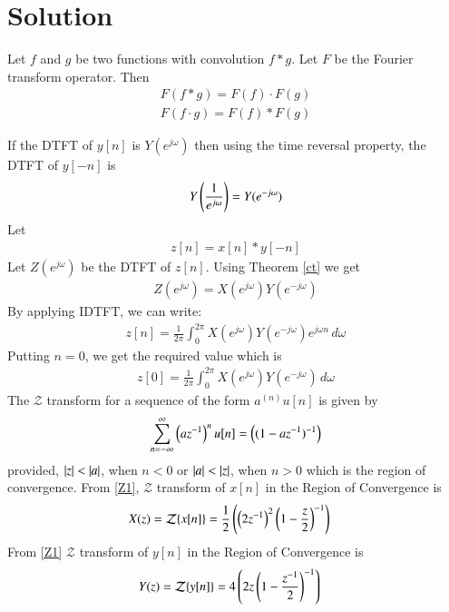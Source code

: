 \documentclass[journal,12pt,twocolumn]{IEEEtran}
\begin{document}
\section{Solution}
\begin{theorem} \label{ct}
Let $f$ and $g$ be two functions with convolution $f*g$. Let $F$ be the Fourier transform operator. Then
\begin{align}
F(f * g)=F(f) \cdot F(g)\\
F(f \cdot g)=F(f) * F(g)
\end{align}
\end{theorem}
If the DTFT of $y[n]$ is $Y(e^{j\omega})$  then using the time reversal property, the DTFT of $y[-n]$ is 
\begin{align}
Y\left(\frac{1}{e^{j\omega}}\right)=Y(e^{-j\omega})  
\end{align}
Let 
\begin{align} \label{convolu}
    z[n]=x[n]*y[-n]
\end{align}
Let $Z(e^{j\omega})$ be the DTFT of $z[n]$. Using Theorem \ref{ct} we get
\begin{align}
  Z(e^{j\omega})= X(e^{j\omega}) Y(e^{-j\omega}) 
\end{align}
By applying IDTFT, we can write:
\begin{align}
z[n]=\frac{1}{2\pi} \int_{0}^{2\pi} X(e^{j\omega}) Y(e^{-j\omega}) e^{j\omega n}\, d\omega  
\end{align}
Putting $n=0$, we get the required value which is
\begin{align}
z[0]=\frac{1}{2\pi} \int_{0}^{2\pi} X(e^{j\omega}) Y(e^{-j\omega})\, d\omega 
\end{align}
The $\mathcal{Z}$ transform for a sequence of the form $a^{(n)}u[n]$ is given by
\begin{align}\label{Z1}
\sum _{n=-\infty }^{\infty }\left({az^{-1}}\right)^n u[n]
=\left(({1-az^{-1}})^{-1}\right)
\end{align}
provided, $\vert z\vert<\vert a\vert$, when $n<0$ or  $\vert a\vert<\vert z\vert$, when $n>0$ which is the region of convergence.
From \eqref{Z1}, $\mathcal{Z} $ transform of $x[n]$ in the Region of Convergence is
\begin{align}
    X(z)&={\mathcal {Z}}\{x[n]\}
    =\frac{1}{2}\left({\left(2z^{-1}\right)^2}\left(1-\frac{z}{2}\right)^{-1}\right)
\end{align}
From \eqref{Z1} $\mathcal{Z} $ transform of $y[n]$ in the Region of Convergence is
\begin{align}
    Y(z)&={\mathcal {Z}}\{y[n]\}=4\left({2z}\left(1-\frac{z^{-1}}{2}\right)^{-1}\right)
\end{align}
\end{document}
